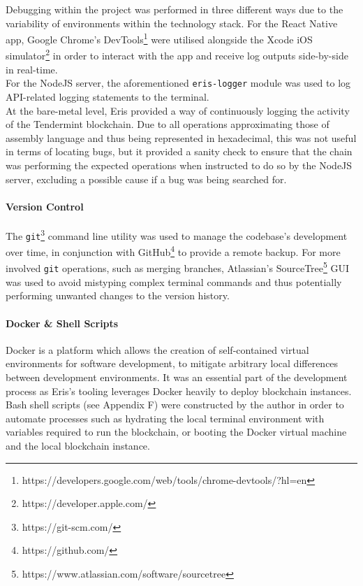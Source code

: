 Debugging within the project was performed in three different ways due
to the variability of environments within the technology stack. For the
React Native app, Google Chrome's
DevTools\footnote{https://developers.google.com/web/tools/chrome-devtools/?hl=en}
were utilised alongside the Xcode iOS
simulator\footnote{https://developer.apple.com/} in order to interact with the app and receive log outputs
side-by-side in real-time.\\
For the NodeJS server, the aforementioned \texttt{eris-logger} module
was used to log API-related logging statements to the terminal.\\
At the bare-metal level, Eris provided a way of continuously logging the
activity of the Tendermint blockchain. Due to all operations
approximating those of assembly language and thus being represented in
hexadecimal, this was not useful in terms of locating bugs, but it
provided a sanity check to ensure that the chain was performing the
expected operations when instructed to do so by the NodeJS server,
excluding a possible cause if a bug was being searched for.

\paragraph{Version Control}\label{version-control}

The \texttt{git}\footnote{https://git-scm.com/} command line utility
was used to manage the codebase's development over time, in conjunction
with GitHub\footnote{https://github.com/} to provide a remote
backup. For more involved \texttt{git} operations, such as merging
branches, Atlassian's
SourceTree\footnote{https://www.atlassian.com/software/sourcetree}
GUI was used to avoid mistyping complex terminal commands and thus
potentially performing unwanted changes to the version history.

\paragraph{Docker \& Shell Scripts}\label{docker-shell-scripts}

Docker\cite{1docker} is a platform which
allows the creation of self-contained virtual environments for software
development, to mitigate arbitrary local differences between development
environments. It was an essential part of the development process as
Eris's tooling leverages Docker heavily to deploy blockchain
instances.\\
Bash shell scripts (see Appendix F) were constructed by the
author in order to automate processes such as hydrating the local
terminal environment with variables required to run the blockchain, or
booting the Docker virtual machine and the local blockchain instance.


